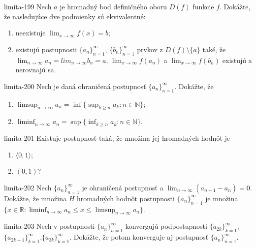 \begin{defproblem}{limita-199}
Nech $a$ je hromadný bod definičného oboru $D(f)$ funkcie $f$. Dokážte, že nasledujúce dve podmienky sú ekvivalentné:
\begin{enumerate}
\item neexistuje $\lim_{x \rightarrow \infty} f(x)=b$;
\item existujú postupnosti ${\{a_n\}}_{n=1}^\infty$, ${\{b_n\}}_{n=1}^\infty$ prvkov z $D(f) \setminus \{a \}$ také, že $\lim_{n \rightarrow \infty} a_n=lim_{n \rightarrow \infty} b_n=a$, $\lim_{x \rightarrow \infty} f(a_n)$ a $\lim_{x \rightarrow \infty} f(b_n)$ existujú a nerovnajú sa.
\end{enumerate}
\end{defproblem}

\begin{defproblem}{limita-200}
Nech je daná ohraničená postupnosť ${\{a_n\}}_{n=1}^\infty$. Dokážte, že
\begin{multicols}{2}
\begin{enumerate}
    \item $\limsup_{n \rightarrow \infty} a_n=\inf \{\sup_{k \geq n} a_k: n \in \mathbb{N}\}$;
    \item $\liminf_{n \rightarrow \infty} a_n= \sup \{\inf_{k \geq n} a_k: n \in \mathbb{N}\}$.
\end{enumerate}
\end{multicols}
\end{defproblem}

\begin{defproblem}{limita-201}
Existuje postupnosť taká, že množina jej hromadných hodnôt je
\begin{enumerate}
\item $\langle 0,1 \rangle$;
\item $(0,1)$?
\end{enumerate}
\end{defproblem}

\begin{defproblem}{limita-202}
Nech ${\{a_n\}}_{n=1}^\infty$ je ohraničená postupnosť a $\lim_{n \rightarrow \infty} (a_{n+1}-a_n)=0$. Dokážte, že množina $H$ hromadných hodnôt postupnosti ${\{a_n\}}_{n=1}^\infty$ je množina $\{x \in \mathbb{R}: \liminf_{n \rightarrow \infty} a_n \leq x \leq \limsup_{n \rightarrow \infty} a_n\}$.
\end{defproblem}

\begin{defproblem}{limita-203}
Nech v postupnosti ${\{a_n\}}_{n=1}^\infty$ konvergujú podpostupnosti ${\{a_{2k}\}}_{k=1}^\infty$,${\{a_{2k-1}\}}_{k=1}^\infty$,${\{a_{3k}\}}_{k=1}^\infty$. Dokážte, že potom konverguje aj postupnosť ${\{a_n\}}_{n=1}^\infty$.
\end{defproblem}

